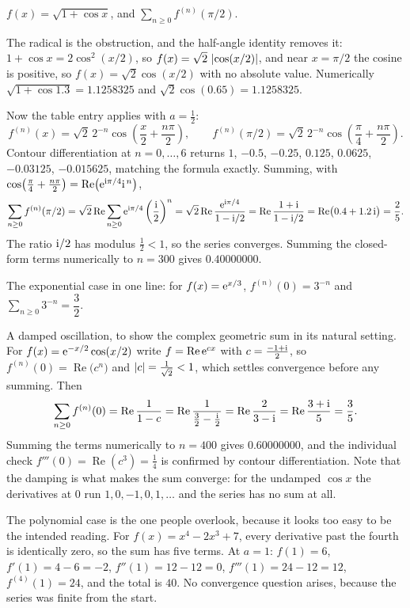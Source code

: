 \begin{worked}
$f(x)=\sqrt{1+\cos x}$, and $\displaystyle\sum_{n\geq0}f^{(n)}(\pi/2)$.

The radical is the obstruction, and the half-angle identity removes it: $1+\cos x=2\cos^{2}(x/2)$, so $f(x)=\sqrt2\,\left\lvert \cos(x/2)\right\rvert$, and near $x=\pi/2$ the cosine is positive, so $f(x)=\sqrt2\cos(x/2)$ with no absolute value. Numerically $\sqrt{1+\cos1.3}=1.1258325$ and $\sqrt2\cos(0.65)=1.1258325$.

Now the table entry applies with $a=\tfrac12$:
\[
f^{(n)}(x)=\sqrt2\,2^{-n}\cos\!\left(\frac x2+\frac{n\pi}{2}\right),\qquad
f^{(n)}(\pi/2)=\sqrt2\,2^{-n}\cos\!\left(\frac\pi4+\frac{n\pi}{2}\right).
\]
Contour differentiation at $n=0,\dots,6$ returns $1$, $-0.5$, $-0.25$, $0.125$, $0.0625$, $-0.03125$, $-0.015625$, matching the formula exactly. Summing, with $\cos\bigl(\tfrac\pi4+\tfrac{n\pi}{2}\bigr)=\operatorname{Re}\bigl(\mathrm{e}^{\mathrm{i}\pi/4}\mathrm{i}^{\,n}\bigr)$,
\[
\sum_{n\geq0}f^{(n)}(\pi/2)=\sqrt2\operatorname{Re}\sum_{n\geq0}\mathrm{e}^{\mathrm{i}\pi/4}\left(\frac{\mathrm{i}}{2}\right)^{n}
=\sqrt2\operatorname{Re}\frac{\mathrm{e}^{\mathrm{i}\pi/4}}{1-\mathrm{i}/2}
=\operatorname{Re}\frac{1+\mathrm{i}}{1-\mathrm{i}/2}=\operatorname{Re}\bigl(0.4+1.2\,\mathrm{i}\bigr)=\frac25 .
\]
The ratio $\mathrm{i}/2$ has modulus $\tfrac12<1$, so the series converges. Summing the closed-form terms numerically to $n=300$ gives $0.40000000$.

The exponential case in one line: for $f(x)=\mathrm{e}^{x/3}$, $f^{(n)}(0)=3^{-n}$ and $\sum_{n\geq0}3^{-n}=\dfrac32$.

A damped oscillation, to show the complex geometric sum in its natural setting. For $f(x)=\mathrm{e}^{-x/2}\cos(x/2)$ write $f=\operatorname{Re}\mathrm{e}^{cx}$ with $c=\tfrac{-1+\mathrm{i}}{2}$, so $f^{(n)}(0)=\operatorname{Re}\bigl(c^{n}\bigr)$ and $\left\lvert c\right\rvert=\tfrac{1}{\sqrt2}<1$, which settles convergence before any summing. Then
\[
\sum_{n\geq0}f^{(n)}(0)=\operatorname{Re}\frac{1}{1-c}=\operatorname{Re}\frac{1}{\tfrac32-\tfrac{\mathrm{i}}{2}}=\operatorname{Re}\frac{2}{3-\mathrm{i}}=\operatorname{Re}\frac{3+\mathrm{i}}{5}=\frac35 .
\]
Summing the terms numerically to $n=400$ gives $0.60000000$, and the individual check $f'''(0)=\operatorname{Re}(c^{3})=\tfrac14$ is confirmed by contour differentiation. Note that the damping is what makes the sum converge: for the undamped $\cos x$ the derivatives at $0$ run $1,0,-1,0,1,\dots$ and the series has no sum at all.

The polynomial case is the one people overlook, because it looks too easy to be the intended reading. For $f(x)=x^{4}-2x^{3}+7$, every derivative past the fourth is identically zero, so the sum has five terms. At $a=1$: $f(1)=6$, $f'(1)=4-6=-2$, $f''(1)=12-12=0$, $f'''(1)=24-12=12$, $f^{(4)}(1)=24$, and the total is $40$. No convergence question arises, because the series was finite from the start.
\end{worked}


